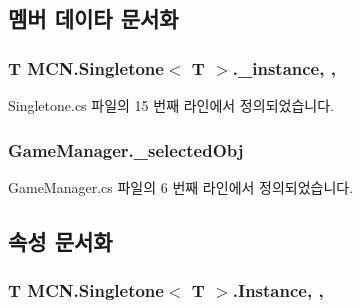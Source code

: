 \subsection{멤버 데이타 문서화}
\subsubsection[{\texorpdfstring{\+\_\+instance}{_instance}}]{\setlength{\rightskip}{0pt plus 5cm}T {\bf M\+C\+N.\+Singletone}$<$ T $>$.\+\_\+instance\hspace{0.3cm}{\ttfamily [static]}, {\ttfamily [protected]}, {\ttfamily [inherited]}}\hypertarget{class_m_c_n_1_1_singletone_a267e8a9e6e7c073b988cda4f95e26eb1}{}\label{class_m_c_n_1_1_singletone_a267e8a9e6e7c073b988cda4f95e26eb1}


Singletone.\+cs 파일의 15 번째 라인에서 정의되었습니다.

\subsubsection[{\texorpdfstring{\+\_\+selected\+Obj}{_selectedObj}}]{ Game\+Manager.\+\_\+selected\+Obj\hspace{0.3cm}{\ttfamily [private]}}\hypertarget{class_game_manager_a5a9b1c2a22af163ddb89c8a55d2f1603}{}\label{class_game_manager_a5a9b1c2a22af163ddb89c8a55d2f1603}


Game\+Manager.\+cs 파일의 6 번째 라인에서 정의되었습니다.



\subsection{속성 문서화}
\subsubsection[{\texorpdfstring{Instance}{Instance}}]{\setlength{\rightskip}{0pt plus 5cm}T {\bf M\+C\+N.\+Singletone}$<$ T $>$.Instance\hspace{0.3cm}{\ttfamily [static]}, {\ttfamily [get]}, {\ttfamily [inherited]}}\hypertarget{class_m_c_n_1_1_singletone_a46dbbebd93e96a9592a9803c51f35602}{}\label{class_m_c_n_1_1_singletone_a46dbbebd93e96a9592a9803c51f35602}


